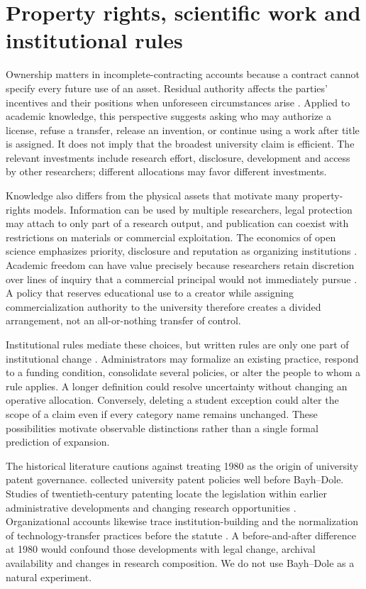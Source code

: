 \documentclass[12pt]{article}
\begin{document}
\section{Property rights, scientific work and institutional rules}
Ownership matters in incomplete-contracting accounts because a contract cannot specify every future use of an asset. Residual authority affects the parties' incentives and their positions when unforeseen circumstances arise \citep{grossman1986,hartmoore1990,hart1995}. Applied to academic knowledge, this perspective suggests asking who may authorize a license, refuse a transfer, release an invention, or continue using a work after title is assigned. It does not imply that the broadest university claim is efficient. The relevant investments include research effort, disclosure, development and access by other researchers; different allocations may favor different investments.

Knowledge also differs from the physical assets that motivate many property-rights models. Information can be used by multiple researchers, legal protection may attach to only part of a research output, and publication can coexist with restrictions on materials or commercial exploitation. The economics of open science emphasizes priority, disclosure and reputation as organizing institutions \citep{dasgupta1994}. Academic freedom can have value precisely because researchers retain discretion over lines of inquiry that a commercial principal would not immediately pursue \citep{aghion2008}. A policy that reserves educational use to a creator while assigning commercialization authority to the university therefore creates a divided arrangement, not an all-or-nothing transfer of control.

Institutional rules mediate these choices, but written rules are only one part of institutional change \citep{north1990}. Administrators may formalize an existing practice, respond to a funding condition, consolidate several policies, or alter the people to whom a rule applies. A longer definition could resolve uncertainty without changing an operative allocation. Conversely, deleting a student exception could alter the scope of a claim even if every category name remains unchanged. These possibilities motivate observable distinctions rather than a single formal prediction of expansion.

The historical literature cautions against treating 1980 as the origin of university patent governance. \citet{palmer1962} collected university patent policies well before Bayh--Dole. Studies of twentieth-century patenting locate the legislation within earlier administrative developments and changing research opportunities \citep{mowery2001,sampat2006}. Organizational accounts likewise trace institution-building and the normalization of technology-transfer practices before the statute \citep{berman2008,colyvas2007}. A before-and-after difference at 1980 would confound those developments with legal change, archival availability and changes in research composition. We do not use Bayh--Dole as a natural experiment.
\end{document}
